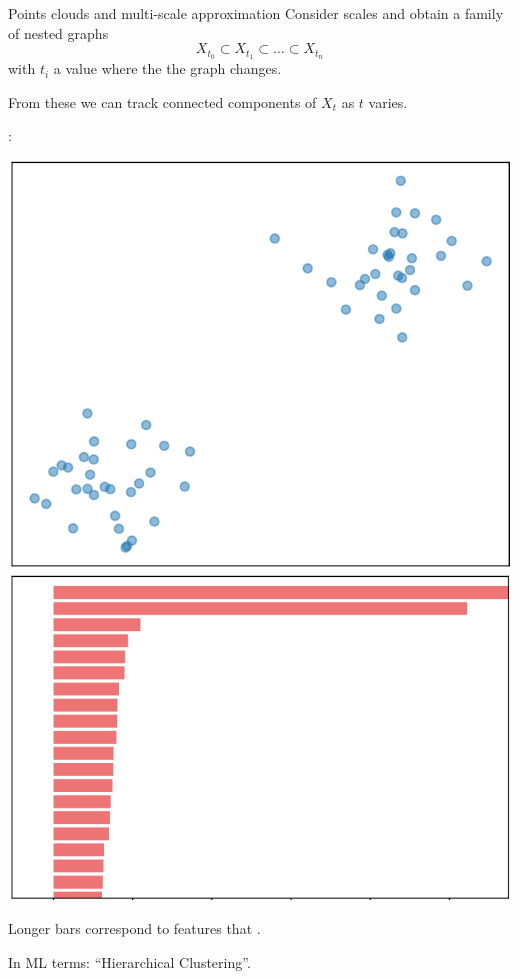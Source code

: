 \begin{frame}{Points clouds and multi-scale approximation}
	\pause
	Consider  scales and obtain a family of nested graphs
	\[
	X_{t_0} \subset X_{t_1} \subset\dots\subset X_{t_n}
	\]
	with $t_i$ a value where the the graph changes.

	\medskip\pause
	From these we can track connected components of $X_t$ as $t$ varies.

	\medskip\pause
	:

	\begin{center}
		\includegraphics[scale=.25]{aux/2Dcloud_cropped.pdf}
		\pause\qquad
		\includegraphics[scale=.313]{aux/2Dbarcode_cropped.pdf}
	\end{center}

	\smallskip\pause
	Longer bars correspond to features that .

	\medskip\pause
	In ML terms: ``Hierarchical Clustering''.
\end{frame}

